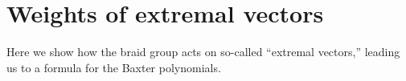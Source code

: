 \chapter{Weights of extremal vectors}

Here we show how the braid group acts on so-called ``extremal vectors,'' leading us to a formula for the Baxter polynomials.
